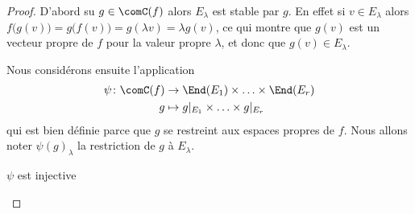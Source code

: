 \begin{proof}
    D'abord su \( g\in\comC(f)\) alors \( E_{\lambda}\) est stable par \( g\). En effet si \( v\in E_{\lambda}\) alors \( f\big( g(v) \big)=g\big( f(v) \big)=g(\lambda v)=\lambda g(v)\), ce qui montre que \( g(v)\) est un vecteur propre de \( f\) pour la valeur propre \( \lambda\), et donc que \( g(v)\in E_{\lambda}\).

    Nous considérons ensuite l'application 
    \begin{equation}
        \begin{aligned}
            \psi\colon \comC(f)&\to \End(E_1)\times \ldots\times \End(E_r) \\
            g&\mapsto  g|_{E_1}\times \ldots\times g|_{E_r}
        \end{aligned}
    \end{equation}
    qui est bien définie parce que \( g\) se restreint aux espaces propres de \( f\). Nous allons noter \( \psi(g)_{\lambda}\) la restriction de \( g\) à \( E_{\lambda}\).
    \begin{subproof}
    \item[\( \psi\) est injective]


\end{subproof}
\end{proof}
